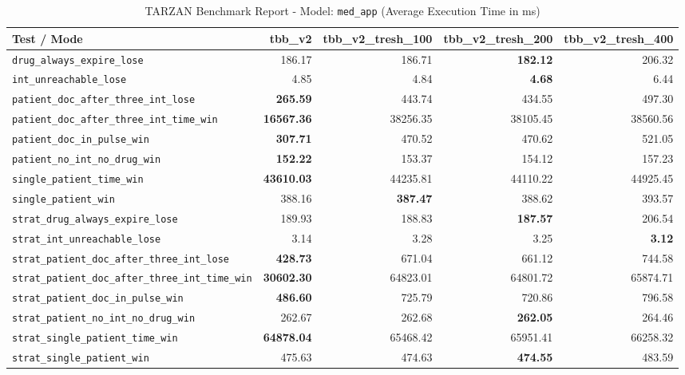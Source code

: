 \begin{table}[htbp]
\centering
\caption{TARZAN Benchmark Report - Model: \texttt{med\_app} (Average Execution Time in ms)}
\label{tab:med_app_benchmark}
\begin{tabular}{lrrrr}
\toprule
\textbf{Test / Mode} & \textbf{tbb\_v2} & \textbf{tbb\_v2\_tresh\_100} & \textbf{tbb\_v2\_tresh\_200} & \textbf{tbb\_v2\_tresh\_400} \\
\midrule
\texttt{drug\_always\_expire\_lose} & 186.17 & 186.71 & \textbf{182.12} & 206.32 \\
\texttt{int\_unreachable\_lose} & 4.85 & 4.84 & \textbf{4.68} & 6.44 \\
\texttt{patient\_doc\_after\_three\_int\_lose} & \textbf{265.59} & 443.74 & 434.55 & 497.30 \\
\texttt{patient\_doc\_after\_three\_int\_time\_win} & \textbf{16567.36} & 38256.35 & 38105.45 & 38560.56 \\
\texttt{patient\_doc\_in\_pulse\_win} & \textbf{307.71} & 470.52 & 470.62 & 521.05 \\
\texttt{patient\_no\_int\_no\_drug\_win} & \textbf{152.22} & 153.37 & 154.12 & 157.23 \\
\texttt{single\_patient\_time\_win} & \textbf{43610.03} & 44235.81 & 44110.22 & 44925.45 \\
\texttt{single\_patient\_win} & 388.16 & \textbf{387.47} & 388.62 & 393.57 \\
\texttt{strat\_drug\_always\_expire\_lose} & 189.93 & 188.83 & \textbf{187.57} & 206.54 \\
\texttt{strat\_int\_unreachable\_lose} & 3.14 & 3.28 & 3.25 & \textbf{3.12} \\
\texttt{strat\_patient\_doc\_after\_three\_int\_lose} & \textbf{428.73} & 671.04 & 661.12 & 744.58 \\
\texttt{strat\_patient\_doc\_after\_three\_int\_time\_win} & \textbf{30602.30} & 64823.01 & 64801.72 & 65874.71 \\
\texttt{strat\_patient\_doc\_in\_pulse\_win} & \textbf{486.60} & 725.79 & 720.86 & 796.58 \\
\texttt{strat\_patient\_no\_int\_no\_drug\_win} & 262.67 & 262.68 & \textbf{262.05} & 264.46 \\
\texttt{strat\_single\_patient\_time\_win} & \textbf{64878.04} & 65468.42 & 65951.41 & 66258.32 \\
\texttt{strat\_single\_patient\_win} & 475.63 & 474.63 & \textbf{474.55} & 483.59 \\
\bottomrule
\end{tabular}
\end{table}